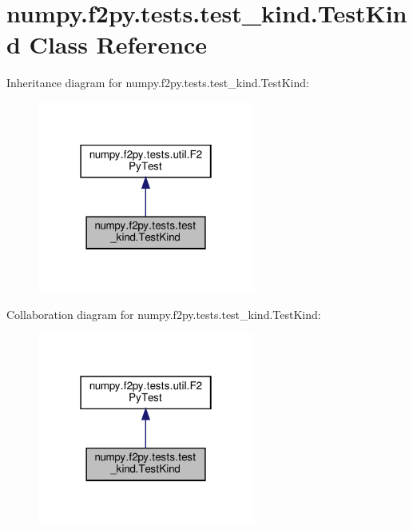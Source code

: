 \hypertarget{classnumpy_1_1f2py_1_1tests_1_1test__kind_1_1TestKind}{}\section{numpy.\+f2py.\+tests.\+test\+\_\+kind.\+Test\+Kind Class Reference}
\label{classnumpy_1_1f2py_1_1tests_1_1test__kind_1_1TestKind}


Inheritance diagram for numpy.\+f2py.\+tests.\+test\+\_\+kind.\+Test\+Kind\+:
\nopagebreak
\begin{figure}[H]
\begin{center}
\leavevmode
\includegraphics[width=202pt]{classnumpy_1_1f2py_1_1tests_1_1test__kind_1_1TestKind__inherit__graph}
\end{center}
\end{figure}


Collaboration diagram for numpy.\+f2py.\+tests.\+test\+\_\+kind.\+Test\+Kind\+:
\nopagebreak
\begin{figure}[H]
\begin{center}
\leavevmode
\includegraphics[width=202pt]{classnumpy_1_1f2py_1_1tests_1_1test__kind_1_1TestKind__coll__graph}
\end{center}
\end{figure}
